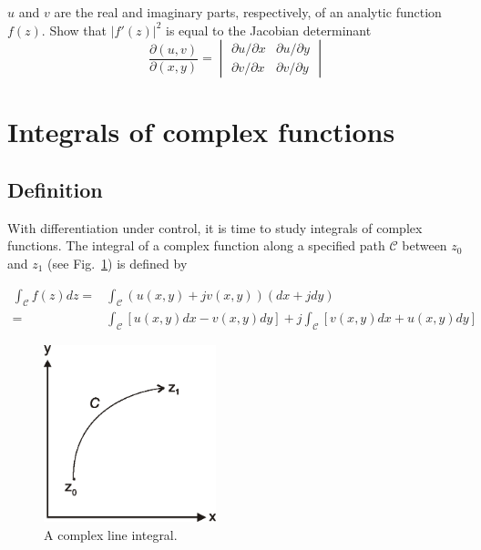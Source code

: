 \begin{sidebar}
\begin{ex} \label{ex-harmonic}
$u$ and $v$ are the real and imaginary parts, respectively, of an analytic function $f(z)$. Show that $|f'(z)|^2$ is equal to the Jacobian determinant
$$\frac{\partial (u,v)}{\partial (x,y)} =  \begin{vmatrix} \partial u / \partial x & \partial u / \partial y \\ \partial v / \partial x & \partial v / \partial y \end{vmatrix}$$
\end{ex}
\end{sidebar}



\section{Integrals of complex functions}

\subsection{Definition}
With differentiation under control, it is time to study integrals of complex
functions. The integral of a complex function along a specified path
$\mathcal{C}$ between $z_0$ and $z_1$ (see Fig.~\ref{fig-integral}) is defined
by

\begin{align}
\int_\mathcal{C}f(z)dz = & \int_\mathcal{C}\left(u(x,y)+jv(x,y)\right)(dx+jdy)
\nonumber \\
= & \int_\mathcal{C}\left[u(x,y)dx-v(x,y)dy\right] + j
\int_\mathcal{C}\left[v(x,y)dx+u(x,y)dy\right] \label{eq-complex-int}
\end{align} 

\begin{figure}
\centering
\includegraphics[width=5cm]{complex/figures/integral}
\caption{A complex line integral.}
\label{fig-integral}
\end{figure}

